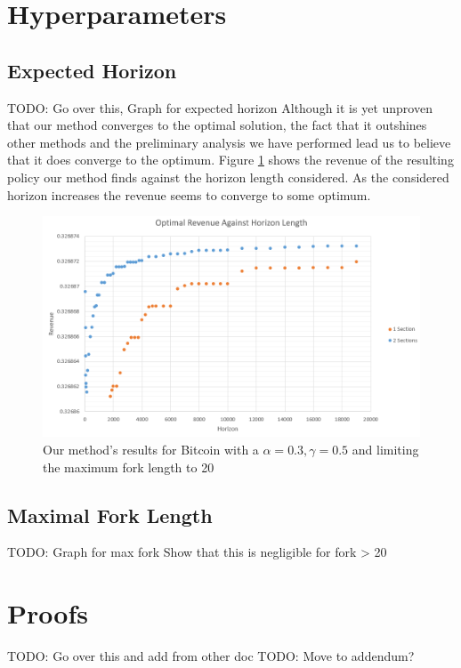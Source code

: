 \documentclass{article}
\begin{document}
\section{Hyperparameters}

\subsection{Expected Horizon}
TODO: Go over this, Graph for expected horizon
Although it is yet unproven that our method converges to the optimal solution, the fact that it outshines other methods and the preliminary analysis we have performed lead us to believe that it does converge to the optimum. Figure \ref{fig:empirical_results} shows the revenue of the resulting policy our method finds against the horizon length considered. As the considered horizon increases the revenue seems to converge to some optimum.
\begin{figure}[H]
    \centering
    \includegraphics[width=\textwidth]{graph1.png}
    \caption{Our method's results for Bitcoin with a $\alpha = 0.3, \gamma = 0.5$ and limiting the maximum fork length to 20}
    \label{fig:empirical_results}
\end{figure}

\subsection{Maximal Fork Length}
TODO: Graph for max fork
Show that this is negligible for fork > 20


\section{Proofs}
TODO: Go over this and add from other doc
TODO: Move to addendum?
\end{document}
